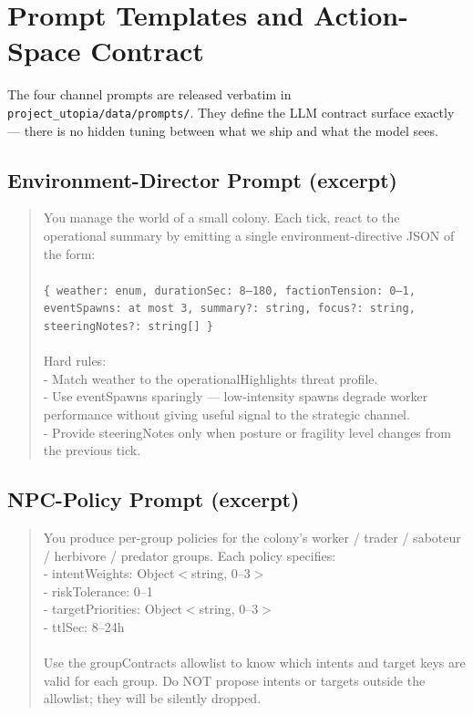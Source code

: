 \section{Prompt Templates and Action-Space Contract}
\label{app:prompts}

The four channel prompts are released verbatim in
\texttt{project\_utopia/data/prompts/}. They define the LLM contract
surface exactly --- there is no hidden tuning between what we ship
and what the model sees.

\subsection{Environment-Director Prompt (excerpt)}

\begin{quote}\small\sffamily
You manage the world of a small colony. Each tick, react to the
operational summary by emitting a single environment-directive
JSON of the form:\\
\\
\texttt{\{ weather: enum, durationSec: 8--180, factionTension: 0--1,
eventSpawns: at most 3, summary?: string, focus?: string,
steeringNotes?: string[] \}}\\
\\
Hard rules:\\
- Match weather to the operationalHighlights threat profile.\\
- Use eventSpawns sparingly --- low-intensity spawns degrade
worker performance without giving useful signal to the
strategic channel.\\
- Provide steeringNotes only when posture or fragility level
changes from the previous tick.
\end{quote}

\subsection{NPC-Policy Prompt (excerpt)}

\begin{quote}\small\sffamily
You produce per-group policies for the colony's worker /
trader / saboteur / herbivore / predator groups. Each policy
specifies:\\
- intentWeights: Object$<$string, 0--3$>$\\
- riskTolerance: 0--1\\
- targetPriorities: Object$<$string, 0--3$>$\\
- ttlSec: 8--24h\\
\\
Use the groupContracts allowlist to know which intents and
target keys are valid for each group. Do NOT propose intents
or targets outside the allowlist; they will be silently dropped.
\end{quote}

